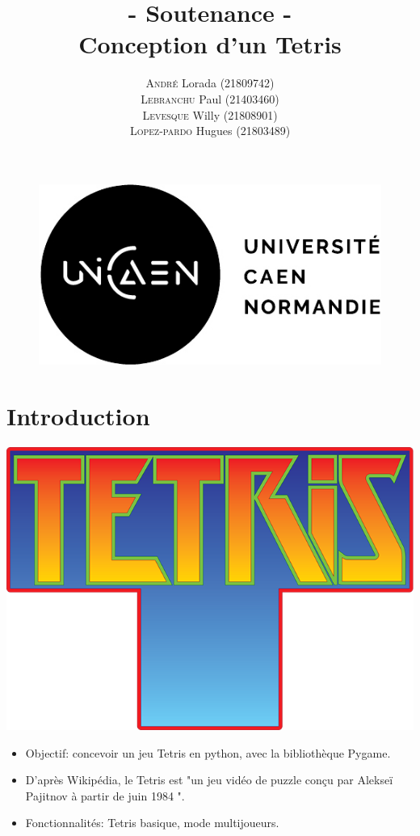 \documentclass{beamer}
\title{- Soutenance -\\ Conception d'un Tetris}
\author{\textsc{André} Lorada  (21809742) \\ \textsc{Lebranchu} Paul  (21403460) \\ \textsc{Levesque} Willy  (21808901)  \\ \textsc{Lopez-pardo} Hugues  (21803489) }
\institute{Université de Caen Normandie}
\begin{document}
\begin{frame}
	\begin{figure}[t]
        \includegraphics[scale=0.75]{images/logo.png}
	\end{figure}
	
	\titlepage
\end{frame}


\begin{frame}
	\tableofcontents
\end{frame}

\section{Introduction}

	\begin{frame}
	    \begin{center}
	        \includegraphics[scale=0.1]{images/logoTetris.png}
	    \end{center}
	    \begin{itemize}
	        \item Objectif: concevoir un jeu Tetris en python, avec la bibliothèque Pygame.
	        \item D'après Wikipédia, le Tetris est "un jeu vidéo de puzzle conçu par Alekseï Pajitnov à partir de juin 1984 ".
	        \item Fonctionnalités: Tetris basique, mode multijoueurs.
	    \end{itemize}
	\end{frame}
	
\end{document}

